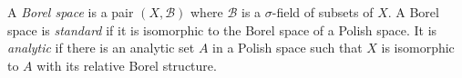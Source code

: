 A \emph{Borel space} is a pair $(X, \mathcal{B})$ where $\mathcal{B}$ is a $\sigma$-field of subsets of $X$. A Borel space is \emph{standard} if it is isomorphic to the Borel space of a Polish space. It is \emph{analytic} if there is an analytic set $A$ in a Polish space such that $X$ is isomorphic to $A$ with its relative Borel structure.
